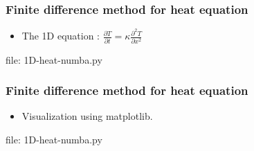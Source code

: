 \begin{frame}[fragile]
\frametitle{Finite difference method for heat equation}
\newcommand{\newfilename}{1D-heat-numba.py}
\begin{itemize}
\item The 1D equation : $\frac{\partial T}{\partial t} = \kappa \frac{\partial^2 T}{\partial x^2}$

\end{itemize}
file: \newfilename
\end{frame}

\begin{frame}[fragile]
\frametitle{Finite difference method for heat equation}
\newcommand{\newfilename}{1D-heat-numba.py}
\begin{itemize}
\item Visualization using matplotlib.

\end{itemize}
file: \newfilename
\end{frame}